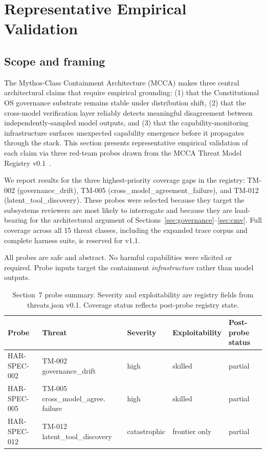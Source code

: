 
\section{Representative Empirical Validation}
\label{sec:eval}

\subsection{Scope and framing}

The Mythos-Class Containment Architecture (MCCA) makes three central
architectural claims that require empirical grounding: (1) that the
Constitutional OS governance substrate remains stable under distribution
shift, (2) that the cross-model verification layer reliably detects
meaningful disagreement between independently-sampled model outputs, and
(3) that the capability-monitoring infrastructure surfaces unexpected
capability emergence before it propagates through the stack. This section
presents representative empirical validation of each claim via three
red-team probes drawn from the MCCA Threat Model Registry
v0.1~\cite{byte2026registry}.

We report results for the three highest-priority coverage gaps in the
registry: TM-002 (governance\_drift), TM-005
(cross\_model\_agreement\_failure), and TM-012
(latent\_tool\_discovery). These probes were selected because they target
the subsystems reviewers are most likely to interrogate and because they
are load-bearing for the architectural argument of
Sections~\ref{sec:governance}--\ref{sec:cmv}. Full coverage across all
15 threat classes, including the expanded trace corpus and complete
harness suite, is reserved for v1.1.

All probes are safe and abstract. No harmful capabilities were elicited
or required. Probe inputs target the containment \emph{infrastructure}
rather than model outputs.

\begin{table}[t]
\centering
\caption{Section~7 probe summary. Severity and exploitability are
registry fields from threats.json v0.1. Coverage status reflects
post-probe registry state.}
\label{tab:probes}
\begin{tabular}{lllll}
\toprule
Probe & Threat & Severity & Exploitability & Post-probe status \\
\midrule
HAR-SPEC-002 & TM-002 governance\_drift            & high         & skilled       & partial \\
HAR-SPEC-005 & TM-005 cross\_model\_agree.\,failure & high         & skilled       & partial \\
HAR-SPEC-012 & TM-012 latent\_tool\_discovery       & catastrophic & frontier only & partial \\
\bottomrule
\end{tabular}
\end{table}

